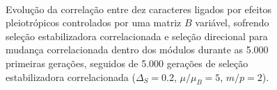 \begin{figure}[htbp]
  \vspace{-18pt}
  \vspace{11pt}
  \\
  \caption{Evolução da correlação entre dez caracteres ligados por efeitos
  pleiotrópicos controlados por uma matriz $B$ variável, sofrendo seleção estabilizadora correlacionada e seleção
  direcional para mudança correlacionada dentro dos módulos
  durante as 5.000 primeiras gerações, seguidos de 5.000 gerações de
  seleção estabilizadora correlacionada ($\Delta_S = 0.2$, $\mu/\mu_B=5$, $m/p=2$).}
  \label{posselecao}
\end{figure}



